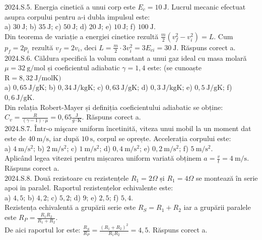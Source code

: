 2024.S.5. Energia cinetică a unui corp este $E_{c}=10 \mathrm{~J}$. Lucrul mecanic efectuat asupra corpului pentru a-i dubla impulsul este:\\ a) $30 \mathrm{~J}$; b) $35 \mathrm{~J}$; c) $50 \mathrm{~J}$; d) $20 \mathrm{~J}$; e) $10 \mathrm{~J}$; f) $100 \mathrm{~J}$.\\ Din teorema de variație a energiei cinetice rezultă $\frac{m}{2}\left(v_{f}^{2}-v_{i}^{2}\right)=L$. Cum $p_{f}=2 p_{i}$ rezultă $v_{f}=2 v_{i}$, deci $L=\frac{m}{2} \cdot 3 v_{i}^{2}=3 E_{ci}=30 \mathrm{~J}$. Răspuns corect a.\\

2024.S.6. Căldura specifică la volum constant a unui gaz ideal cu masa molară $\mu=32 \mathrm{~g} / \mathrm{mol}$ și coeficientul adiabatic $\gamma=1,4$ este: (se cunoaște $\mathrm{R}=8,32 \mathrm{~J} / \mathrm{molK})$\\ a) $0,65 \mathrm{~J} / \mathrm{gK}$; b) $0,34 \mathrm{~J} / \mathrm{kgK}$; c) $0,63 \mathrm{~J} / \mathrm{gK}$; d) $0,3 \mathrm{~J} / \mathrm{kgK}$; e) $0,5 \mathrm{~J} / \mathrm{gK}$; f) $0,6 \mathrm{~J} / \mathrm{gK}$.\\ Din relația Robert-Mayer și definiția coeficientului adiabatic se obține:\\ $C_{v}=\frac{R}{(\gamma-1) \cdot \mu}=0,65 \frac{\mathrm{J}}{g \cdot \mathrm{K}}$. Răspuns corect a.\\

2024.S.7. Într-o mişcare uniform încetinită, viteza unui mobil la un moment dat este de $40 \mathrm{~m} / \mathrm{s}$, iar după $10 \mathrm{~s}$, corpul se oprește. Accelerația corpului este:\\ a) $4 \mathrm{~m} / \mathrm{s}^{2}$; b) $2 \mathrm{~m} / \mathrm{s}^{2}$; c) $1 \mathrm{~m} / \mathrm{s}^{2}$; d) $0,4 \mathrm{~m} / \mathrm{s}^{2}$; e) $0,2 \mathrm{~m} / \mathrm{s}^{2}$; f) $5 \mathrm{~m} / \mathrm{s}^{2}$.\\ Aplicând legea vitezei pentru mișcarea uniform variată obținem $a=\frac{v}{t}=4 \mathrm{~m} / \mathrm{s}$. Răspuns corect a.\\

2024.S.8. Două rezistoare cu rezistențele $R_{1}=2 \Omega$ și $R_{1}=4 \Omega$ se montează în serie apoi in paralel. Raportul rezistențelor echivalente este:\\ a) $4,5$; b) $4,2$; c) $5,2$; d) $9$; e) $2,5$; f) $5,4$.\\ Rezistența echivalentă a grupării serie este $R_{S}=R_{1}+R_{2}$ iar a grupării paralele este $R_{P}=\frac{R_{1} R_{2}}{R_{1}+R_{2}}$.\\ De aici raportul lor este: $\frac{R_{S}}{R_{P}}=\frac{\left(R_{1}+R_{2}\right)^{2}}{R_{1} R_{2}}=4,5$. Răspuns corect a.\\

